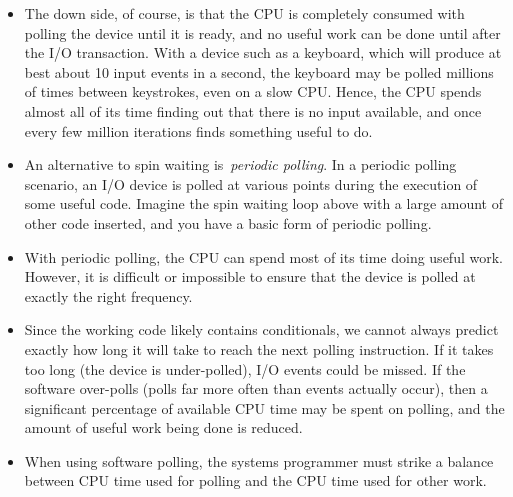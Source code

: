 \documentclass[12pt]{article}
\begin{document}
\begin{itemize}
	\item {\fontsize{13pt}{15.6pt}\selectfont The down side, of course, is that the CPU is completely consumed with polling the device until it is ready, and no useful work can be done until after the I/O transaction. With a device such as a keyboard, which will produce at best about 10 input events in a second, the keyboard may be polled millions of times between keystrokes, even on a slow CPU. Hence, the CPU spends almost all of its time finding out that there is no input available, and once every few million iterations finds something useful to do.\par}\par

	\item {\fontsize{13pt}{15.6pt}\selectfont An alternative to spin waiting is \textit{periodic polling}. In a periodic polling scenario, an I/O device is polled at various points during the execution of some useful code. Imagine the spin waiting loop above with a large amount of other code inserted, and you have a basic form of periodic polling.\par}\par

	\item {\fontsize{13pt}{15.6pt}\selectfont With periodic polling, the CPU can spend most of its time doing useful work. However, it is difficult or impossible to ensure that the device is polled at exactly the right frequency.\par}\par

	\item {\fontsize{13pt}{15.6pt}\selectfont Since the working code likely contains conditionals, we cannot always predict exactly how long it will take to reach the next polling instruction. If it takes too long (the device is under-polled), I/O events could be missed. If the software over-polls (polls far more often than events actually occur), then a significant percentage of available CPU time may be spent on polling, and the amount of useful work being done is reduced.\par}\par

	\item {\fontsize{13pt}{15.6pt}\selectfont When using software polling, the systems programmer must strike a balance between CPU time used for polling and the CPU time used for other work.\par}\par


\end{itemize}
\end{document}
